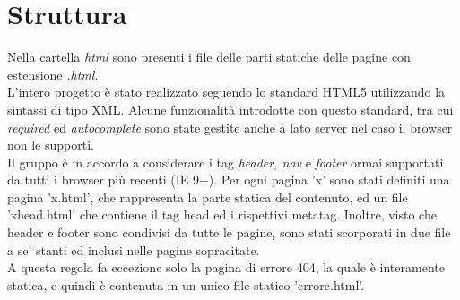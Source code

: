 \section{Struttura}
Nella cartella \textit{html} sono presenti i file delle parti statiche delle pagine con estensione \textit{.html}.\\
L'intero progetto è stato realizzato seguendo lo standard HTML5 utilizzando la sintassi di tipo XML. Alcune funzionalità introdotte con questo standard, tra cui \textit{required} ed \textit{autocomplete} sono state gestite anche a lato server nel caso il browser non le supporti.\\
Il gruppo è in accordo a considerare i tag \textit{header, nav} e \textit{footer} ormai supportati da tutti i browser più recenti (IE 9+).
Per ogni pagina 'x' sono stati definiti una pagina 'x.html', che rappresenta la parte statica del contenuto, ed un file 'x\textunderscore head.html' che contiene il tag head ed i rispettivi metatag. Inoltre, visto che header e footer sono condivisi da tutte le pagine, sono stati scorporati in due file a se' stanti ed inclusi nelle pagine sopracitate. \\
A questa regola fa eccezione solo la pagina di errore 404, la quale è interamente statica, e quindi è contenuta in un unico file statico 'errore.html'.



\newpage
